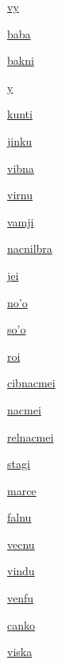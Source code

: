 {\hyperlink{val:vy}{vy}}{}{}{}

{\hyperlink{val:baba}{baba}}{}{}{}

{\hyperlink{val:bakni}{bakni}}{}{}{}

{\hyperlink{val:y}{y}}{}{}{}

{\hyperlink{val:kunti}{kunti}}{}{}{}

{\hyperlink{val:jinku}{jinku}}{}{}{}

{\hyperlink{val:vibna}{vibna}}{}{}{}

{\hyperlink{val:virnu}{virnu}}{}{}{}

{\hyperlink{val:vamji}{vamji}}{}{}{}

{\hyperlink{val:nacnilbra}{nacnilbra}}{}{}{}

{\hyperlink{val:jei}{jei}}{}{}{}

{\hyperlink{val:noho}{no'o}}{}{}{}

{\hyperlink{val:soho}{so'o}}{}{}{}

{\hyperlink{val:roi}{roi}}{}{}{}

{\hyperlink{val:cibnacmei}{cibnacmei}}{}{}{}

{\hyperlink{val:nacmei}{nacmei}}{}{}{}

{\hyperlink{val:relnacmei}{relnacmei}}{}{}{}

{\hyperlink{val:stagi}{stagi}}{}{}{}

{\hyperlink{val:marce}{marce}}{}{}{}

{\hyperlink{val:falnu}{falnu}}{}{}{}

{\hyperlink{val:vecnu}{vecnu}}{}{}{}

{\hyperlink{val:vindu}{vindu}}{}{}{}

{\hyperlink{val:venfu}{venfu}}{}{}{}

{\hyperlink{val:canko}{canko}}{}{}{}

{\hyperlink{val:viska}{viska}}{}{}{}


